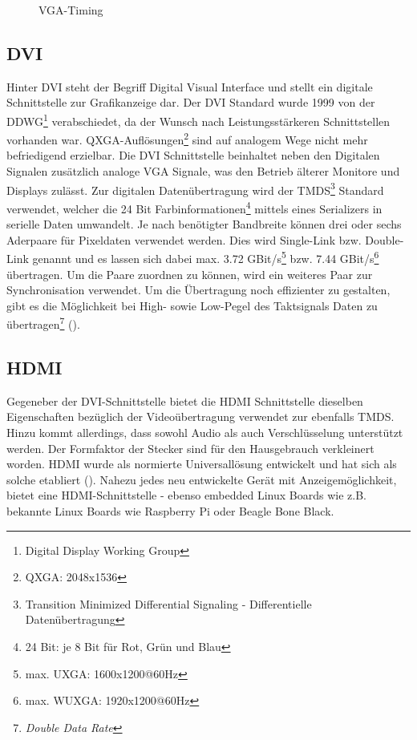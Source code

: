 \begin{figure}[htp]
	\centering
{}
	\caption{VGA-Timing}
	\label{fig:vga_timing}
\end{figure}

\subsection{DVI}
Hinter DVI steht der Begriff Digital Visual Interface und stellt ein digitale Schnittstelle zur Grafikanzeige dar. Der DVI Standard wurde 1999 von der DDWG\footnote{Digital Display Working Group} verabschiedet, da der Wunsch nach Leistungsstärkeren Schnittstellen vorhanden war. QXGA-Auflösungen\footnote{QXGA: 2048x1536} sind auf analogem Wege nicht mehr befriedigend erzielbar. Die DVI Schnittstelle beinhaltet neben den Digitalen Signalen zusätzlich analoge VGA Signale, was den Betrieb älterer Monitore und Displays zulässt. Zur digitalen Datenübertragung wird der TMDS\footnote{Transition Minimized Differential Signaling - Differentielle Datenübertragung} Standard verwendet, welcher die 24 Bit Farbinformationen\footnote{24 Bit: je 8 Bit für Rot, Grün und Blau} mittels eines Serializers in serielle Daten umwandelt. Je nach benötigter Bandbreite können drei oder sechs Aderpaare für Pixeldaten verwendet werden. Dies wird Single-Link bzw. Double-Link genannt und es lassen sich dabei max. 3.72 GBit/s\footnote{max. UXGA: 1600x1200@60Hz} bzw. 7.44 GBit/s\footnote{max. WUXGA: 1920x1200@60Hz} übertragen. Um die Paare zuordnen zu können, wird ein weiteres Paar zur Synchronisation verwendet. Um die Übertragung noch effizienter zu gestalten, gibt es die Möglichkeit bei High- sowie Low-Pegel des Taktsignals Daten zu übertragen\footnote{\textit{Double Data Rate}} (\cite{Leunig2002}).

\subsection{HDMI}
Gegeneber der DVI-Schnittstelle bietet die HDMI Schnittstelle dieselben Eigenschaften bezüglich der Videoübertragung verwendet zur ebenfalls TMDS. Hinzu kommt allerdings, dass sowohl Audio als auch Verschlüsselung unterstützt werden. Der Formfaktor der Stecker sind für den Hausgebrauch verkleinert worden. HDMI wurde als normierte Universallösung entwickelt und hat sich als solche etabliert (\cite{Extron2014}). Nahezu jedes neu entwickelte Gerät mit Anzeigemöglichkeit, bietet eine HDMI-Schnittstelle - ebenso embedded Linux Boards wie z.B. bekannte Linux Boards wie Raspberry Pi oder Beagle Bone Black.

